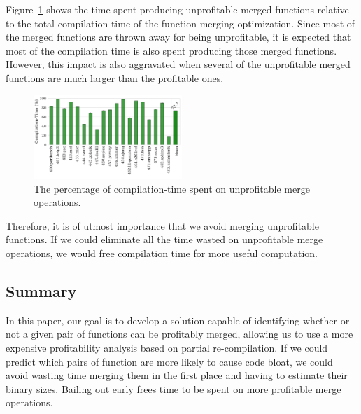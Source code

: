 
Figure~\ref{fig:unprofitable-compile-time-percentage} shows the time spent producing unprofitable merged functions relative to the total compilation time of the function merging optimization.
Since most of the merged functions are thrown away for being unprofitable, it is expected that most of the compilation time is also spent producing those merged functions.
However, this impact is also aggravated when several of the unprofitable merged functions are much larger than the profitable ones.

\begin{figure}[h]
  \centering
  \includegraphics[width=0.5\textwidth]{figs/unprofitable-compile-time-percentage.pdf}
  \vspace{-2.5em}
  \caption{The percentage of compilation-time spent on unprofitable merge operations.}
  \label{fig:unprofitable-compile-time-percentage}
\end{figure}

Therefore, it is of utmost importance that we avoid merging unprofitable functions.
If we could eliminate all the time wasted on unprofitable merge operations, we would free compilation time for more useful computation.

\subsection{Summary}

In this paper, our goal is to develop a solution capable of identifying whether or not a given pair of functions can be profitably merged, allowing us to use a more expensive profitability analysis based on partial re-compilation.
If we could predict which pairs of function are more likely to cause code bloat, we could avoid wasting time merging them in the first place and having to estimate their binary sizes.
Bailing out early frees time to be spent on more profitable merge operations.


